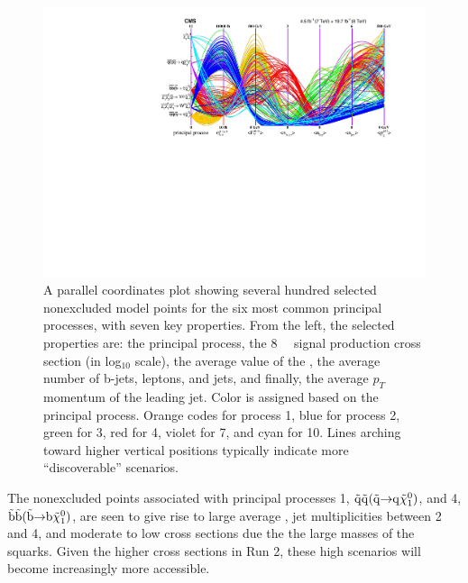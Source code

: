 \begin{figure}[tb!]
  \centering
         \includegraphics[width=1.0\linewidth]{figures/pMSSMpaper/parallel_coordinates/ParCorTopos.pdf}
    \caption{A parallel coordinates plot showing several hundred
      selected nonexcluded model points for the six most common
      principal processes, with seven key properties.
      From the left, the selected properties are: the principal
      process, the 8~\TeV~ signal production cross section (in
      log$_{\text{10}}$ scale), the average value of the \MET{}, the average number of
      b-jets, leptons, and jets, and finally, the average $p_{T}$
      momentum of the leading jet. Color is assigned based on the
      principal process. Orange codes for process 1, blue for
      process 2, green for 3, red for 4, violet for 7, and 
      cyan for 10.  Lines
      arching toward higher vertical positions typically indicate more
      ``discoverable'' scenarios. }
    \label{fig:parcor}
\end{figure}


The nonexcluded points associated with principal processes 1, $\tilde{\rm q}\tilde{\rm q}(\tilde{\rm q} \hspace{-1mm}\rightarrow \hspace{-1mm}{\rm q}\tilde{\chi}_{1}^{0})$, and 4, $\tilde{\rm b}\tilde{\rm b}(\tilde{\rm b} \hspace{-1mm}\rightarrow \hspace{-1mm}{\rm b}\tilde{\chi}_{1}^{0})$, are seen to give rise to large average \MET{}, jet multiplicities between 2 and 4, and moderate to low cross sections due the the large masses of the squarks. Given the
higher cross sections in Run 2, these high \MET{} scenarios will become increasingly more accessible.

